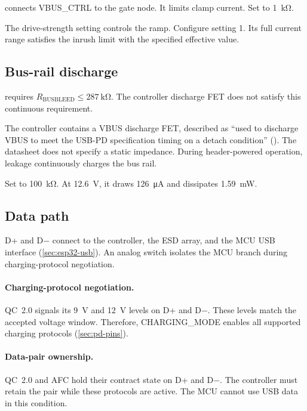  connects VBUS\_CTRL to the gate node. It limits clamp current.
Set  to \SI{1}{\kilo\ohm}.

The drive-strength setting controls the ramp. Configure setting 1. Its full
current range satisfies the inrush limit with the specified effective
 value.

\subsection{Bus-rail discharge}\label{sec:pd-bleed}

 requires
$R_{\mathrm{BUSBLEED}}\leq\SI{287}{\kilo\ohm}$. The controller discharge FET
does not satisfy this continuous requirement.

The controller contains a VBUS discharge FET, described as
``used to discharge VBUS to meet the USB-PD specification timing on a detach
condition'' (). The datasheet
does not specify a static impedance. During header-powered operation,
 leakage continuously charges the bus rail.

Set  to \SI{100}{\kilo\ohm}. At \SI{12.6}{\volt}, it draws
\SI{126}{\micro\ampere} and dissipates \SI{1.59}{\milli\watt}.

\subsection{Data path}\label{sec:pd-data}

D+ and D$-$ connect to the controller, the ESD array, and the MCU USB interface
(\cref{sec:esp32-usb}). An analog switch isolates the MCU branch during
charging-protocol negotiation.

\paragraph{Charging-protocol negotiation.} QC~2.0 signals its
\SI{9}{\volt} and \SI{12}{\volt} levels on D+ and D$-$. These levels match the
accepted voltage window. Therefore, CHARGING\_MODE enables all supported
charging protocols (\cref{sec:pd-pins}).

\paragraph{Data-pair ownership.} QC~2.0 and AFC hold their contract state on
D+ and D$-$. The controller must retain the pair while these protocols are
active. The MCU cannot use USB data in this condition.

